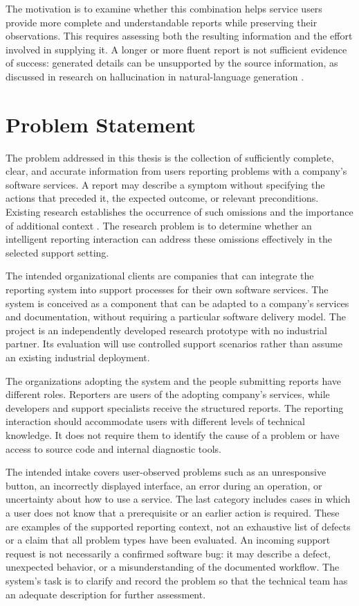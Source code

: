 The motivation is to examine whether this combination helps service users provide more complete and understandable reports while preserving their observations. This requires assessing both the resulting information and the effort involved in supplying it. A longer or more fluent report is not sufficient evidence of success: generated details can be unsupported by the source information, as discussed in research on hallucination in natural-language generation \cite{ji2023}.

\section{Problem Statement}
\label{sec:problem}

The problem addressed in this thesis is the collection of sufficiently complete, clear, and accurate information from users reporting problems with a company's software services. A report may describe a symptom without specifying the actions that preceded it, the expected outcome, or relevant preconditions. Existing research establishes the occurrence of such omissions and the importance of additional context \cite{chaparro2017,wang2025}. The research problem is to determine whether an intelligent reporting interaction can address these omissions effectively in the selected support setting.

The intended organizational clients are companies that can integrate the reporting system into support processes for their own software services. The system is conceived as a component that can be adapted to a company's services and documentation, without requiring a particular software delivery model. The project is an independently developed research prototype with no industrial partner. Its evaluation will use controlled support scenarios rather than assume an existing industrial deployment.

The organizations adopting the system and the people submitting reports have different roles. Reporters are users of the adopting company's services, while developers and support specialists receive the structured reports. The reporting interaction should accommodate users with different levels of technical knowledge. It does not require them to identify the cause of a problem or have access to source code and internal diagnostic tools.

The intended intake covers user-observed problems such as an unresponsive button, an incorrectly displayed interface, an error during an operation, or uncertainty about how to use a service. The last category includes cases in which a user does not know that a prerequisite or an earlier action is required. These are examples of the supported reporting context, not an exhaustive list of defects or a claim that all problem types have been evaluated. An incoming support request is not necessarily a confirmed software bug: it may describe a defect, unexpected behavior, or a misunderstanding of the documented workflow. The system's task is to clarify and record the problem so that the technical team has an adequate description for further assessment.

